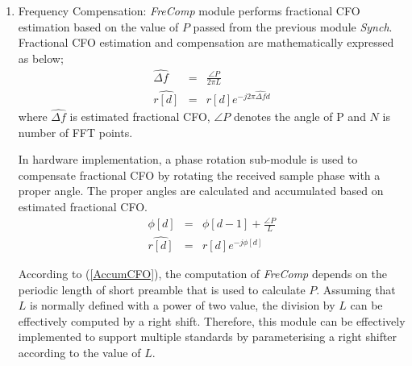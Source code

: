 \begin{enumerate}
\item{Frequency Compensation:}
\emph{FreComp} module performs fractional CFO estimation based on the value of $P$ passed from the previous module \emph{Synch}. 
Fractional CFO estimation and compensation are mathematically expressed as below;
\begin{eqnarray}
\label{fractionalCFO}
\widehat{\Delta f } &=& \frac{\angle P}{2\pi L} \nonumber \\
\widehat{r[d]} &=& r[d] e^{-j2\pi\widehat{\Delta f} d}
\end{eqnarray}
where $\widehat{\Delta f }$ is estimated fractional CFO, $\angle P$ denotes the angle of P and $N$ is number of FFT points.

In hardware implementation, a phase rotation sub-module is used to compensate fractional CFO by rotating the received sample phase with a proper angle.
The proper angles are calculated and accumulated based on estimated fractional CFO.
\begin{eqnarray}
\label{AccumCFO}
\phi[d] &=& \phi[d-1] + \frac{\angle P}{L} \nonumber \\
\widehat{r[d]} &=& r[d] e^{-j \phi[d]}
\end{eqnarray}

According to (\ref{AccumCFO}), the computation of \emph{FreComp} depends on the periodic length of short preamble that is used to calculate $P$. 
Assuming that $L$ is normally defined with a power of two value, the division by $L$ can be effectively computed by a right shift.
Therefore, this module can be effectively implemented to support multiple standards by parameterising a right shifter according to the value of $L$. 


\end{enumerate}
